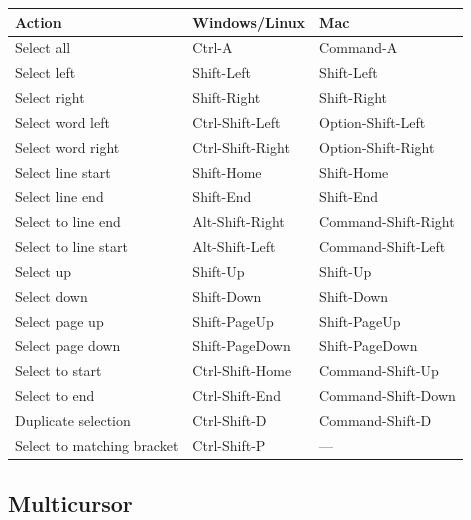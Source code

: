 \documentclass[
]{book}
\begin{document}
\begin{longtable}[]{@{}lll@{}}
\toprule()
Action & Windows/Linux & Mac \\
\midrule()
\endhead
Select all & Ctrl-A & Command-A \\
Select left & Shift-Left & Shift-Left \\
Select right & Shift-Right & Shift-Right \\
Select word left & Ctrl-Shift-Left & Option-Shift-Left \\
Select word right & Ctrl-Shift-Right & Option-Shift-Right \\
Select line start & Shift-Home & Shift-Home \\
Select line end & Shift-End & Shift-End \\
Select to line end & Alt-Shift-Right & Command-Shift-Right \\
Select to line start & Alt-Shift-Left & Command-Shift-Left \\
Select up & Shift-Up & Shift-Up \\
Select down & Shift-Down & Shift-Down \\
Select page up & Shift-PageUp & Shift-PageUp \\
Select page down & Shift-PageDown & Shift-PageDown \\
Select to start & Ctrl-Shift-Home & Command-Shift-Up \\
Select to end & Ctrl-Shift-End & Command-Shift-Down \\
Duplicate selection & Ctrl-Shift-D & Command-Shift-D \\
Select to matching bracket & Ctrl-Shift-P & --- \\
\bottomrule()
\end{longtable}

\hypertarget{multicursor}{%
\subsection{Multicursor}\label{multicursor}}
\end{document}
